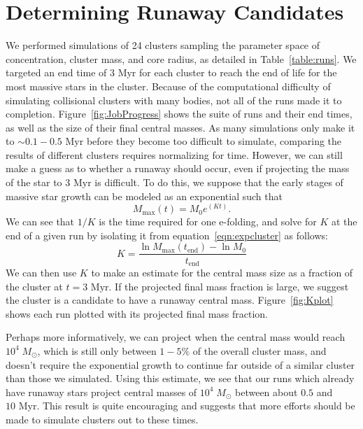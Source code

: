 \documentclass{princeton_astro_thesis}
\newcommand\Msun{\; M_\odot}
\newcommand\Myr{\mbox{ Myr}}
\numberwithin{equation}{section}
\begin{document}
\section{Determining Runaway Candidates}
We performed simulations of 24 clusters sampling the parameter space of concentration, cluster mass, and core radius, as detailed in Table~\ref{table:runs}. We targeted an end time of $3 \Myr$ for each cluster to reach the end of life for the most massive stars in the cluster. Because of the computational difficulty of simulating collisional clusters with many bodies, not all of the runs made it to completion. Figure~\ref{fig:JobProgress} shows the suite of runs and their end times, as well as the size of their final central masses. As many simulations only make it to $\sim 0.1 - 0.5 \Myr$ before they become too difficult to simulate, comparing the results of different clusters requires normalizing for time. However, we can still make a guess as to whether a runaway should occur, even if projecting the mass of the star to $3 \Myr$ is difficult. To do this, we suppose that the early stages of massive star growth can be modeled as an exponential such that
\begin{equation}
    M_{\mathrm{max}}(t) = M_{0} e^{(Kt)}.
    \label{eqn:expcluster}
\end{equation}
We can see that $1/K$ is the time required for one e-folding, and solve for $K$ at the end of a given run by isolating it from equation~\ref{eqn:expcluster} as follows:
\begin{equation}
K = \frac{\ln M_{\mathrm{max}}(t_{\mathrm{end}}) - \ln M_{0}}{t_{\mathrm{end}}}
\end{equation}
We can then use $K$ to make an estimate for the central mass size as a fraction of the cluster at $t = 3 \Myr$.  If the projected final mass fraction is large, we suggest the cluster is a candidate to have a runaway central mass. Figure~\ref{fig:Kplot} shows each run plotted with its projected final mass fraction.

Perhaps more informatively, we can project when the central mass would reach $10^4 \Msun$, which is still only between $1-5\%$ of the overall cluster mass, and doesn't require the exponential growth to continue far outside of a similar cluster than those we simulated.  Using this estimate, we see that our runs which already have runaway stars project central masses of $10^4 \Msun$ between about $0.5$ and $10 \Myr$. This result is quite encouraging and suggests that more efforts should be made to simulate clusters out to these times.
\end{document}
